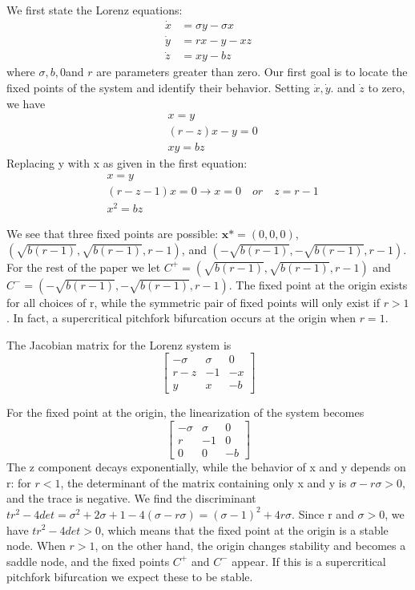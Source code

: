 \documentclass{report}
\begin{document}
We first state the Lorenz equations:
\begin{align*}
   \dot{x} &= \sigma y - \sigma x \\
   \dot{y} &= rx - y - xz \\
   \dot{z} &= xy - bz
\end{align*}
where \( \sigma , b,0\)and \(r\) are parameters greater than zero. Our first
goal is to locate the fixed points of the system and identify their behavior.
Setting \(\dot{x},\dot{y}\). and \(\dot{z}\) to zero, we have
\begin{align*}
   &x = y \\
   &(r-z)x - y = 0 \\
   &xy = bz
\end{align*}
Replacing y with x as given in the first equation:
\begin{align*}
  &x = y \\
  &(r-z-1)x = 0 \rightarrow x = 0 \quad or \quad z = r-1 \\
  &x^2 = bz
\end{align*}

We see that three fixed points are possible: \(\boldsymbol{x\mbox{*}} = (0,0,0)\),
\((\sqrt{b(r-1)},\sqrt{b(r-1)},r-1)\), and \((-\sqrt{b(r-1)},-\sqrt{b(r-1)},r-1)\).
For the rest of the paper we let \(C^+ =(\sqrt{b(r-1)},\sqrt{b(r-1)},r-1)\) and
\(C^- =(-\sqrt{b(r-1)},-\sqrt{b(r-1)},r-1)\).
The fixed point at the origin exists for all choices of r, while the symmetric 
pair of fixed points will only exist if \(r > 1\). In fact, a supercritical 
pitchfork bifurcation occurs at the origin when \( r = 1 \).

The Jacobian matrix for the Lorenz system is
\[
\begin{bmatrix}
   -\sigma & \sigma & 0 \\
   r - z & -1 & -x \\
   y & x & -b
\end{bmatrix}
\]

For the fixed point at the origin, the linearization of the system becomes
\[
\begin{bmatrix}
   -\sigma & \sigma & 0 \\
   r & -1 & 0 \\
   0 & 0 & -b

\end{bmatrix}
\]
The z component decays exponentially, while the behavior of x and y depends on 
r: for \( r < 1\), the determinant of the matrix containing only x and y is
\(\sigma - r\sigma > 0\), and the trace is negative. We find the discriminant 
\(tr^2 - 4det = \sigma^2 +2\sigma + 1 -4(\sigma -r\sigma) = (\sigma - 1)^2 +
  4r\sigma\). Since r and \(\sigma > 0 \), we have \(tr^2 -4det > 0\), which 
means that the fixed point at the origin is a stable node. When \(r > 1\), on 
the other hand, the origin changes stability and becomes a saddle node, and the
fixed points \(C^+\) and \(C^-\) appear. If this is a supercritical pitchfork
bifurcation we expect these to be stable.
\end{document}

